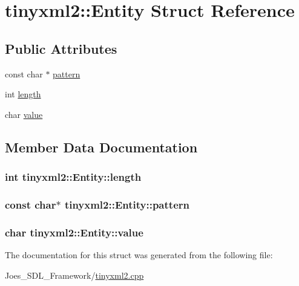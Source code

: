 \hypertarget{structtinyxml2_1_1_entity}{\section{tinyxml2\-:\-:Entity Struct Reference}
\label{structtinyxml2_1_1_entity}
}
\subsection*{Public Attributes}
\begin{DoxyCompactItemize}
\item 
const char $\ast$ \hyperlink{structtinyxml2_1_1_entity_ab330f5d665d29bfc811ecfa76315894b}{pattern}
\item 
int \hyperlink{structtinyxml2_1_1_entity_a25e2b57cb59cb4fa68f283d7cb570f21}{length}
\item 
char \hyperlink{structtinyxml2_1_1_entity_a7334e81e33b4615655a403711b24f3ed}{value}
\end{DoxyCompactItemize}


\subsection{Member Data Documentation}
\hypertarget{structtinyxml2_1_1_entity_a25e2b57cb59cb4fa68f283d7cb570f21}{
\subsubsection[{length}]{\setlength{\rightskip}{0pt plus 5cm}int tinyxml2\-::\-Entity\-::length}}\label{structtinyxml2_1_1_entity_a25e2b57cb59cb4fa68f283d7cb570f21}
\hypertarget{structtinyxml2_1_1_entity_ab330f5d665d29bfc811ecfa76315894b}{
\subsubsection[{pattern}]{\setlength{\rightskip}{0pt plus 5cm}const char$\ast$ tinyxml2\-::\-Entity\-::pattern}}\label{structtinyxml2_1_1_entity_ab330f5d665d29bfc811ecfa76315894b}
\hypertarget{structtinyxml2_1_1_entity_a7334e81e33b4615655a403711b24f3ed}{
\subsubsection[{value}]{\setlength{\rightskip}{0pt plus 5cm}char tinyxml2\-::\-Entity\-::value}}\label{structtinyxml2_1_1_entity_a7334e81e33b4615655a403711b24f3ed}


The documentation for this struct was generated from the following file\-:\begin{DoxyCompactItemize}
\item 
Joes\-\_\-\-S\-D\-L\-\_\-\-Framework/\hyperlink{tinyxml2_8cpp}{tinyxml2.\-cpp}\end{DoxyCompactItemize}
